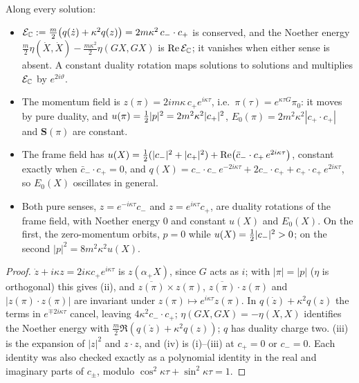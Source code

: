 \begin{proposition}
\label{d2:prop:interior}
Along every solution:
\begin{itemize}
\item[(i)] $\mathcal E_{\mathbb{C}}:=\tfrac m2\bigl(q(\dot z)+\kappa^2q(z)\bigr)=2m\kappa^2\,c_-\cdot c_+$ is conserved, and the Noether energy
$\tfrac m2\eta(\dot X,\dot X)-\tfrac{m\kappa^2}2\eta(GX,GX)$ is $\operatorname{Re}\mathcal E_{\mathbb{C}}$; it vanishes when either sense is absent. A constant duality rotation
maps solutions to solutions and multiplies $\mathcal E_{\mathbb{C}}$ by $e^{2i\vartheta}$.
\item[(ii)] The momentum field is $z(\pi)=2im\kappa\,c_+e^{i\kappa\tau}$, i.e.\ $\pi(\tau)=e^{\kappa\tau G}\pi_0$: it moves by pure duality, and
$u(\pi)=\tfrac12|p|^2=2m^2\kappa^2|c_+|^2$, $E_0(\pi)=2m^2\kappa^2|c_+\cdot c_+|$ and $\mathbf S(\pi)$ are constant.
\item[(iii)] The frame field has $u(X)=\tfrac12(|c_-|^2+|c_+|^2)+\operatorname{Re}\bigl(\bar c_-\cdot c_+\,e^{2i\kappa\tau}\bigr)$, constant exactly when
$\bar c_-\cdot c_+=0$, and $q(X)=c_-\cdot c_-\,e^{-2i\kappa\tau}+2c_-\cdot c_++c_+\cdot c_+\,e^{2i\kappa\tau}$, so $E_0(X)$ oscillates in general.
\item[(iv)] Both pure senses, $z=e^{-i\kappa\tau}c_-$ and $z=e^{i\kappa\tau}c_+$, are duality rotations of the frame field, with Noether energy $0$ and
constant $u(X)$ and $E_0(X)$. On the first, the zero-momentum orbits, $p=0$ while $u(X)=\tfrac12|c_-|^2>0$; on the second $|p|^2=8m^2\kappa^2u(X)$.
\end{itemize}
\end{proposition}

\begin{proof}
$\dot z+i\kappa z=2i\kappa c_+e^{i\kappa\tau}$ is $z(\alpha_+X)$, since $G$ acts as $i$; with $|\pi|=|p|$ ($\eta$ is orthogonal) this gives (ii), and
$\overline{z(\pi)}\times z(\pi)$, $\overline{z(\pi)}\cdot z(\pi)$ and $|z(\pi)\cdot z(\pi)|$ are invariant under $z(\pi)\mapsto e^{i\kappa\tau}z(\pi)$. In $q(\dot z)+\kappa^2q(z)$ the terms in $e^{\mp2i\kappa\tau}$
cancel, leaving $4\kappa^2c_-\cdot c_+$; $\eta(GX,GX)=-\eta(X,X)$ identifies the Noether energy with $\tfrac m2\Re(q(\dot z)+\kappa^2q(z))$; $q$ has
duality charge two. (iii) is the expansion of $|z|^2$ and $z\cdot z$, and (iv) is (i)--(iii) at $c_+=0$ or $c_-=0$. Each identity was also checked
exactly as a polynomial identity in the real and imaginary parts of $c_\pm$, modulo $\cos^2\kappa\tau+\sin^2\kappa\tau=1$.
\end{proof}

